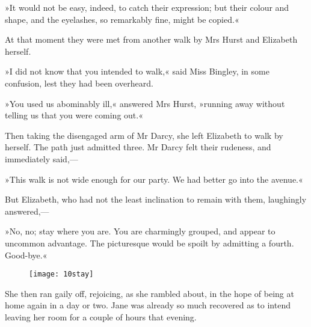 »It would not be easy, indeed, to catch their expression; but their colour and shape, and the eyelashes, so remarkably fine, might be copied.«

At that moment they were met from another walk by Mrs Hurst and Elizabeth herself.

»I did not know that you intended to walk,« said Miss Bingley, in some confusion, lest they had been overheard.

»You used us abominably ill,« answered Mrs Hurst, »running away without telling us that you were coming out.«

Then taking the disengaged arm of Mr Darcy, she left Elizabeth to walk by herself. The path just admitted three. Mr Darcy felt their rudeness, and immediately said,—

»This walk is not wide enough for our party. We had better go into the avenue.«

But Elizabeth, who had not the least inclination to remain with them, laughingly answered,—

»No, no; stay where you are. You are charmingly grouped, and appear to uncommon advantage. The picturesque would be spoilt by admitting a fourth. Good-bye.«

\begin{figure}[tbph]
\centering
\texttt{[image: 10stay]}
\end{figure}

She then ran gaily off, rejoicing, as she rambled about, in the hope of being at home again in a day or two. Jane was already so much recovered as to intend leaving her room for a couple of hours that evening.